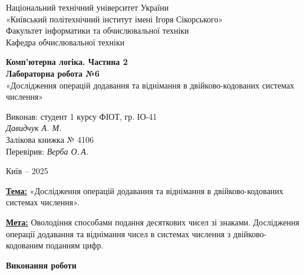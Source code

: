 \documentclass[12pt,a4paper]{article}
\begin{document}
    \begin{titlepage}

        \thispagestyle{empty}
        \begin{center}
        \large
        Національний технічний університет України\\
        «Київський політехнічний інститут імені Ігоря Сікорського»\\[1em]
        Факультет інформатики та обчислювальної техніки\\
        Кафедра обчислювальної техніки
        \end{center}

        \vfill

        \begin{center}
        \textbf{\LARGE Комп'ютерна логіка. Частина 2}\\[2em]
        \textbf{\Large Лабораторна робота №6}\\
        «Дослідження операцій додавання та віднімання в двійково-кодованих системах числення» 
        \end{center}

        \vfill

        \begin{flushright}
        Виконав: студент 1 курсу ФІОТ, гр. ІО-41\\
        \textit{Давидчук А. М.}\\
        Залікова книжка № 4106\\[1em]
        Перевірив: \textit{Верба О.\,А.}
        \end{flushright}

        \vfill

        \begin{center}
        Київ -- 2025
        \end{center}

    \end{titlepage}

    \setlength{\parindent}{0pt}

    \textbf{\underline{Тема:}} «Дослідження операцій додавання та віднімання в двійково-кодованих системах числення».

    \vspace{1em}
    
    \textbf{\underline{Мета:}} Оволодіння способами подання десяткових чисел зі знаками. Дослідження операції додавання та віднімання чисел в системах числення з двійково-кодованим поданням цифр.

    \begin{center} \textbf{\large Виконання роботи} \end{center}
\end{document}
